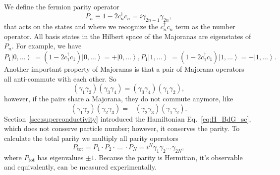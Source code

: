 We define the fermion parity operator
\begin{equation}
P_{n}\equiv1-2c_{n}^{\dagger}c_{n}=i\gamma_{2n-1}\gamma_{2n},
\end{equation}
that acts on the states and where we recognize the $c_{n}^{\dagger}c_{n}$ term as the number operator.
All basis states in the Hilbert space of the Majoranas are eigenstates of $P_{n}$.
For example, we have
\begin{subequations}
\begin{equation}
P_{1}\left|0,\dots\right\rangle \ =(1-2c_{1}^{\dagger}c_{1})\left|0,\dots\right\rangle =+\left|0,\dots\right\rangle ,
\end{equation}

\begin{equation}
P_{1}\left|1,\dots\right\rangle \ =(1-2c_{1}^{\dagger}c_{1})\left|1,\dots\right\rangle =-\left|1,\dots\right\rangle .
\end{equation}
\end{subequations}
Another important property of Majoranas is that a pair of Majorana operators all anti-commute with each other.
So
\begin{equation}
(\gamma_{1}\gamma_{2})(\gamma_{3}\gamma_{4})=(\gamma_{3}\gamma_{4})(\gamma_{1}\gamma_{2}),
\end{equation}
however, if the pairs share a Majorana, they do not commute anymore, like
\begin{equation}
(\gamma_{1}\gamma_{2})(\gamma_{2}\gamma_{3})=-(\gamma_{2}\gamma_{3})(\gamma_{1}\gamma_{2}).
\end{equation}
Section~\ref{sec:superconductivity} introduced the Hamiltonian Eq.~\eqref{eq:H_BdG_sc}, which does not conserve particle number; however, it conserves the parity.
To calculate the total parity we multiply all parity operators
\begin{equation}
P_{\textrm{tot}}=P_{1}\cdot P_{2}\cdot\,\dots\,\cdot P_{N}=i^{N}\gamma_{1}\gamma_{2}\dots\gamma_{2N},
\end{equation}
where $P_{\textrm{tot}}$ has eigenvalues $\pm1$.
Because the parity is Hermitian, it's observable and equivalently, can be measured experimentally.

